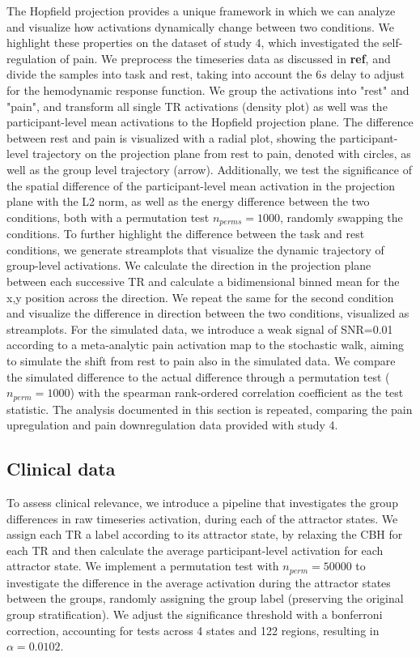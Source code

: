 \documentclass{article}
\begin{document}
The Hopfield projection provides a unique framework in which we can analyze and visualize how activations dynamically
change between two conditions. We highlight these properties on the dataset of study 4, which investigated
the self-regulation of pain. We preprocess the timeseries data as discussed in \textbf{ref}, and divide the samples into
task and rest, taking into account the $6 s$ delay to adjust for the hemodynamic response function.
We group the activations into "rest" and "pain", and transform all single TR activations (density plot) as well was the
participant-level mean activations to the Hopfield projection plane.
The difference between rest and pain is visualized with a radial plot, showing the participant-level trajectory on
the projection plane from rest to pain, denoted with circles, as well as the group level trajectory (arrow).
Additionally, we test the significance of the spatial difference of the participant-level mean activation in
the projection plane with the L2 norm,
as well as the energy difference between the two conditions, both with a permutation test $n_{perms}=1000$,
randomly swapping the conditions.
To further highlight the difference between the task and rest conditions, we generate streamplots that visualize the
dynamic trajectory of group-level activations.
We calculate the direction in the projection plane between each successive TR and calculate a bidimensional binned
mean for the x,y position across the direction.
We repeat the same for the second condition and visualize the difference in direction between the two conditions,
visualized as streamplots.
For the simulated data, we introduce a weak signal of SNR=0.01 according to a meta-analytic pain activation map
\citep{zunhammer2021meta} to the stochastic walk, aiming to simulate the shift from rest to pain also in the
simulated data. We compare the simulated difference to the actual difference through a permutation test
($n_{perm}=1000$) with the spearman rank-ordered correlation coefficient as the test statistic.
The analysis documented in this section is repeated, comparing the pain upregulation and pain downregulation
data provided with study 4.

\subsection{Clinical data}\label{Clinical data}

To assess clinical relevance, we introduce a pipeline that investigates the group differences in raw timeseries
activation, during each of the attractor states.
We assign each TR a label according to its attractor state, by relaxing the CBH for each TR and then calculate the
average participant-level activation for each attractor state.
We implement a permutation test with $n_{perm}=50000$ to investigate the difference in the average activation during the
attractor states between the groups, randomly assigning the group label (preserving the original group stratification).
We adjust the significance threshold with a bonferroni correction, accounting for tests across 4 states and 122 regions,
resulting in $\alpha = 0.0102$.
\end{document}
